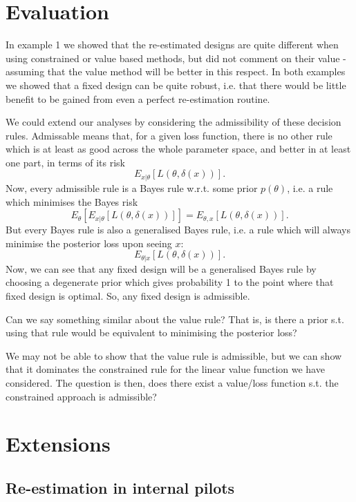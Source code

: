\documentclass[sagev, Crown]{sagej}
\begin{document}
\section{Evaluation}

In example 1 we showed that the re-estimated designs are quite different when using constrained or value based methods, but did not comment on their value - assuming that the value method will be better in this respect. In both examples we showed that a fixed design can be quite robust, i.e. that there would be little benefit to be gained from even a perfect re-estimation routine. 

We could extend our analyses by considering the admissibility of these decision rules. Admissable means that, for a given loss function, there is no other rule which is at least as good across the whole parameter space, and better in at least one part, in terms of its risk
$$
E_{x | \theta}[L(\theta, \delta(x))].
$$
Now, every admissible rule is a Bayes rule w.r.t. some prior $p(\theta)$, i.e. a rule which minimises the Bayes risk
$$
E_{\theta}[ E_{x | \theta}[L(\theta, \delta(x))] ] = E_{\theta, x}[L(\theta, \delta(x))].
$$
But every Bayes rule is also a generalised Bayes rule, i.e. a rule which will always minimise the posterior loss upon seeing $x$:
$$
E_{\theta | x} [L(\theta, \delta(x))].
$$
Now, we can see that any fixed design will be a generalised Bayes rule by choosing a degenerate prior which gives probability 1 to the point where that fixed design is optimal. So, any fixed design is admissible. 

Can we say something similar about the value rule? That is, is there a prior s.t. using that rule would be equivalent to minimising the posterior loss?

We may not be able to show that the value rule is admissible, but we can show that it dominates the constrained rule for the linear value function we have considered. The question is then, does there exist a value/loss function s.t. the constrained approach is admissible? 

\section{Extensions}\label{sec:extensions}

\subsection{Re-estimation in internal pilots}
\end{document}
